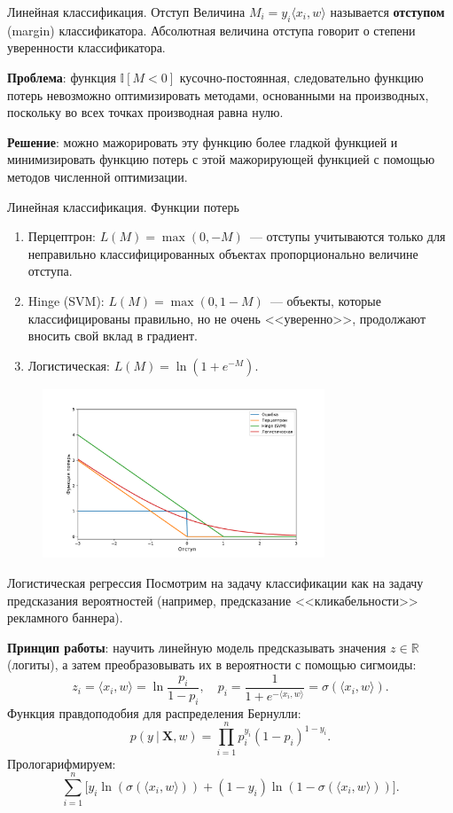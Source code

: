 \documentclass[notheorems, handout]{beamer}
\begin{document}
\begin{frame}{Линейная классификация. Отступ}
	Величина $M_i=y_i \langle x_i, w\rangle$ называется \textbf{отступом} (margin) классификатора. Абсолютная величина отступа говорит о степени уверенности классификатора.\medskip

	\textbf{Проблема}: функция $\mathbb{I}[M < 0]$ кусочно-постоянная, следовательно функцию потерь невозможно оптимизировать методами, основанными на производных, поскольку во всех точках производная равна нулю.\medskip

	\textbf{Решение}: можно мажорировать эту функцию более гладкой функцией и минимизировать функцию потерь с этой мажорирующей функцией с помощью методов численной оптимизации.
\end{frame}

\begin{frame}{Линейная классификация. Функции потерь}
	\begin{enumerate}
		\item Перцептрон: $L(M) = \max(0, -M)$~--- отступы учитываются только для неправильно классифицированных объектах пропорционально величине отступа.
		\item Hinge (SVM): $L(M) = \max(0, 1-M)$~--- объекты, которые классифицированы правильно, но не очень <<уверенно>>, продолжают вносить свой вклад в градиент.
		\item Логистическая: $L(M) = \ln\left(1+e^{-M}\right)$.
	\end{enumerate}
	\begin{figure}
		\includegraphics[width=0.75\textwidth]{img/loss_major.pdf}
	\end{figure}
\end{frame}

\begin{frame}{Логистическая регрессия}
	Посмотрим на задачу классификации как на задачу предсказания вероятностей (например, предсказание <<кликабельности>> рекламного баннера).

	\textbf{Принцип работы}: научить линейную модель предсказывать значения $z\in\mathbb{R}$ (логиты), а затем преобразовывать их в вероятности с помощью сигмоиды:
	\[
		z_i=\langle x_i, w\rangle = \ln\frac{p_i}{1 - p_i},\quad p_i = \frac{1}{1+e^{-\langle x_i, w\rangle}}=\sigma(\langle x_i, w\rangle).
	\]
	Функция правдоподобия для распределения Бернулли:
	\[
		p(y~|~\mathbf{X}, w)=\prod_{i=1}^np_i^{y_i}(1-p_i)^{1-y_i}.
	\]
	Прологарифмируем:
	\[
		\sum_{i=1}^n\Big[y_i\ln(\sigma(\langle x_i, w\rangle)) + (1-y_i)\ln(1-\sigma(\langle x_i, w\rangle))\Big].
	\]
\end{frame}
\end{document}
